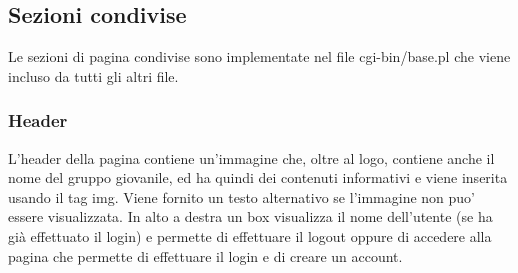 \documentclass[a4paper,10pt]{article}
\begin{document}
\subsection{Sezioni condivise}
Le sezioni di pagina condivise sono implementate nel file cgi-bin/base.pl che viene incluso da tutti gli altri file.

\subsubsection{Header}
L'header della pagina contiene un'immagine che, oltre al logo, contiene anche il
nome del gruppo giovanile, ed ha quindi dei contenuti informativi e viene inserita usando il tag 
img. Viene fornito un testo alternativo se l'immagine non puo' essere visualizzata.
In alto a destra un box visualizza il nome dell'utente (se ha gi\`a effettuato il login) e permette
di effettuare il logout oppure di accedere alla pagina che permette di effettuare il login e di creare un account.
\end{document}
